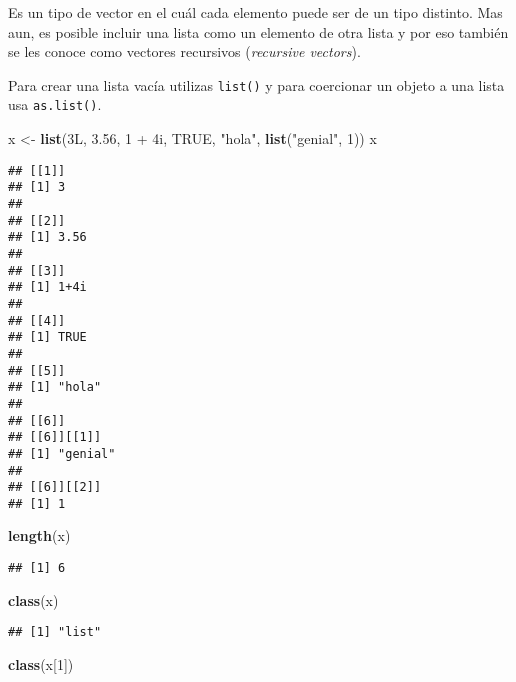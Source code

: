 \documentclass[]{article}
\newenvironment{Shaded}{\begin{snugshade}}{\end{snugshade}}
\newcommand{\KeywordTok}[1]{\textcolor[rgb]{0.13,0.29,0.53}{\textbf{{#1}}}}
\newcommand{\DecValTok}[1]{\textcolor[rgb]{0.00,0.00,0.81}{{#1}}}
\newcommand{\FloatTok}[1]{\textcolor[rgb]{0.00,0.00,0.81}{{#1}}}
\newcommand{\StringTok}[1]{\textcolor[rgb]{0.31,0.60,0.02}{{#1}}}
\newcommand{\OtherTok}[1]{\textcolor[rgb]{0.56,0.35,0.01}{{#1}}}
\newcommand{\NormalTok}[1]{{#1}}
\begin{document}
Es un tipo de vector en el cuál cada elemento puede ser de un tipo
distinto. Mas aun, es posible incluir una lista como un elemento de otra
lista y por eso también se les conoce como vectores recursivos
(\emph{recursive vectors}).

Para crear una lista vacía utilizas \texttt{list()} y para coercionar un
objeto a una lista usa \texttt{as.list()}.

\begin{Shaded}
\begin{Highlighting}[]
\NormalTok{x <-}\StringTok{ }\KeywordTok{list}\NormalTok{(3L, }\FloatTok{3.56}\NormalTok{, }\DecValTok{1} \NormalTok{+}\StringTok{ }\NormalTok{4i, }\OtherTok{TRUE}\NormalTok{, }\StringTok{"hola"}\NormalTok{, }\KeywordTok{list}\NormalTok{(}\StringTok{"genial"}\NormalTok{, }\DecValTok{1}\NormalTok{))}
\NormalTok{x}
\end{Highlighting}
\end{Shaded}

\begin{verbatim}
## [[1]]
## [1] 3
## 
## [[2]]
## [1] 3.56
## 
## [[3]]
## [1] 1+4i
## 
## [[4]]
## [1] TRUE
## 
## [[5]]
## [1] "hola"
## 
## [[6]]
## [[6]][[1]]
## [1] "genial"
## 
## [[6]][[2]]
## [1] 1
\end{verbatim}

\begin{Shaded}
\begin{Highlighting}[]
\KeywordTok{length}\NormalTok{(x)}
\end{Highlighting}
\end{Shaded}

\begin{verbatim}
## [1] 6
\end{verbatim}

\begin{Shaded}
\begin{Highlighting}[]
\KeywordTok{class}\NormalTok{(x)}
\end{Highlighting}
\end{Shaded}

\begin{verbatim}
## [1] "list"
\end{verbatim}

\begin{Shaded}
\begin{Highlighting}[]
\KeywordTok{class}\NormalTok{(x[}\DecValTok{1}\NormalTok{])}
\end{Highlighting}
\end{Shaded}
\end{document}
